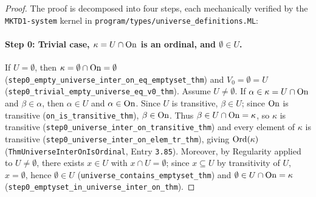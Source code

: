 \begin{proof}
The proof is decomposed into four steps, each mechanically verified by the \texttt{MKTD1-system} kernel in \texttt{program/types/universe\_definitions.ML}:

\paragraph{Step 0: Trivial case, $\kappa = U \cap \mathrm{On}$ is an ordinal, and $\emptyset \in U$.}
If $U = \emptyset$, then $\kappa = \emptyset \cap \mathrm{On} = \emptyset$ (\texttt{step0\_empty\_universe\_inter\_on\_eq\_emptyset\_thm}) and $V_0 = \emptyset = U$ (\texttt{step0\_trivial\_empty\_universe\_eq\_v0\_thm}). Assume $U \neq \emptyset$.
If $\alpha \in \kappa = U \cap \mathrm{On}$ and $\beta \in \alpha$, then $\alpha \in U$ and $\alpha \in \mathrm{On}$. Since $U$ is transitive, $\beta \in U$; since $\mathrm{On}$ is transitive (\texttt{on\_is\_transitive\_thm}), $\beta \in \mathrm{On}$. Thus $\beta \in U \cap \mathrm{On} = \kappa$, so $\kappa$ is transitive (\texttt{step0\_universe\_inter\_on\_transitive\_thm}) and every element of $\kappa$ is transitive (\texttt{step0\_universe\_inter\_on\_elem\_tr\_thm}), giving $\mathrm{Ord}(\kappa)$ (\texttt{ThmUniverseInterOnIsOrdinal}, Entry \texttt{3.85}). Moreover, by Regularity applied to $U \neq \emptyset$, there exists $x \in U$ with $x \cap U = \emptyset$; since $x \subseteq U$ by transitivity of $U$, $x = \emptyset$, hence $\emptyset \in U$ (\texttt{universe\_contains\_emptyset\_thm}) and $\emptyset \in U \cap \mathrm{On} = \kappa$ (\texttt{step0\_emptyset\_in\_universe\_inter\_on\_thm}).


\end{proof}
